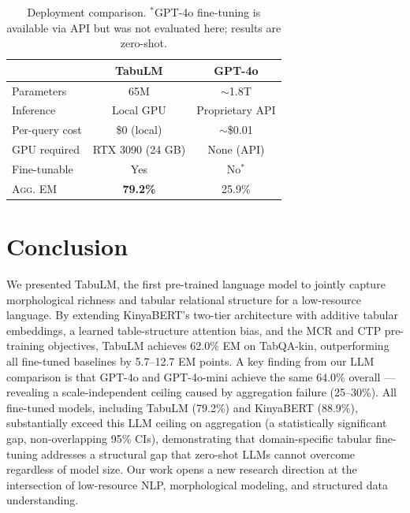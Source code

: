 \documentclass[11pt]{article}
\begin{document}
\begin{table}[h]
\centering
\small
\begin{tabular}{lcc}
\toprule
 & \textbf{TabuLM} & \textbf{GPT-4o} \\
\midrule
Parameters      & 65M             & ${\sim}$1.8T    \\
Inference       & Local GPU       & Proprietary API \\
Per-query cost  & \$0 (local)     & ${\sim}$\$0.01  \\
GPU required    & RTX 3090 (24 GB)& None (API)      \\
Fine-tunable    & Yes             & No$^{*}$        \\
\textsc{Agg.} EM & \textbf{79.2\%} & 25.9\%          \\
\bottomrule
\end{tabular}
\caption{Deployment comparison. $^{*}$GPT-4o fine-tuning is available via API but was not evaluated here; results are zero-shot.}
\label{tab:efficiency}
\end{table}

\section{Conclusion}
\label{sec:conclusion}

We presented TabuLM, the first pre-trained language model to jointly capture morphological richness and tabular relational structure for a low-resource language.
By extending KinyaBERT's two-tier architecture with additive tabular embeddings, a learned table-structure attention bias, and the MCR and CTP pre-training objectives, TabuLM achieves 62.0\% EM on TabQA-kin, outperforming all fine-tuned baselines by 5.7--12.7 EM points.
A key finding from our LLM comparison is that GPT-4o and GPT-4o-mini achieve the same 64.0\% overall --- revealing a scale-independent ceiling caused by aggregation failure (25--30\%).
All fine-tuned models, including TabuLM (79.2\%) and KinyaBERT (88.9\%), substantially exceed this LLM ceiling on aggregation (a statistically significant gap, non-overlapping 95\% CIs), demonstrating that domain-specific tabular fine-tuning addresses a structural gap that zero-shot LLMs cannot overcome regardless of model size.
Our work opens a new research direction at the intersection of low-resource NLP, morphological modeling, and structured data understanding.

\end{document}
